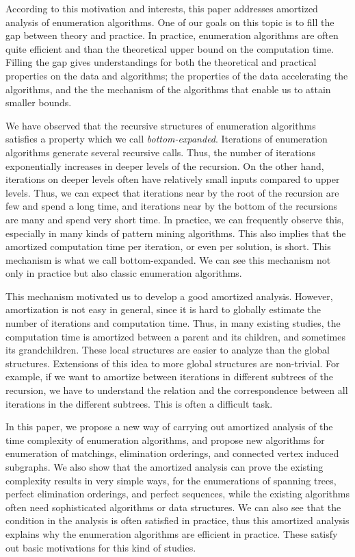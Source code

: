 \documentclass{llncs}
\begin{document}
According to this motivation and interests, this paper addresses
 amortized analysis of enumeration algorithms.
One of our goals on this topic is to fill the gap between theory and practice.
In practice, enumeration algorithms are often quite efficient and
 than the theoretical upper bound on the computation time.
Filling the gap gives understandings for both the theoretical and 
 practical properties on the data and algorithms; the properties 
 of the data accelerating the algorithms, and the the mechanism of the
 algorithms that enable us to attain smaller bounds.

We have observed that the recursive structures of enumeration algorithms
 satisfies a property which we call {\em bottom-expanded}.
Iterations of enumeration algorithms generate several recursive calls.
Thus, the number of iterations exponentially increases 
 in deeper levels of the recursion.
On the other hand, iterations on deeper levels often have relatively
 small inputs compared to upper levels.
Thus, we can expect that iterations near by the root of the recursion are
 few and spend a long time, and iterations near by the bottom of the
 recursions are many and spend very short time.
In practice, we can frequently observe this, especially in many kinds of
 pattern mining algorithms.
This also implies that the amortized computation time per
 iteration, or even per solution, is short.
This mechanism is what we call bottom-expanded.
We can see this mechanism not only in practice but also classic
 enumeration algorithms.

This mechanism motivated us to develop a good amortized analysis.
However, amortization is not easy in general, since it is hard to globally
 estimate the number of iterations and computation time.
Thus, in many existing studies, the computation time is amortized between 
 a parent and its children, and sometimes its
 grandchildren\cite{enumPEO,Ep90,Ep94,ksubtree,KpRm95,SrTmUn97}.
These local structures are easier to analyze than the global structures.
Extensions of this idea to more global structures are non-trivial.
For example, if we want to amortize between iterations in different subtrees
 of the recursion, we have to understand the relation and the correspondence
 between all iterations in the different subtrees.
This is often a difficult task.

In this paper, we propose a new way of carrying out amortized analysis of
 the time complexity of enumeration algorithms, and propose new algorithms
 for enumeration of matchings, elimination orderings, and connected 
 vertex induced subgraphs.
We also show that the amortized analysis can prove the existing complexity
 results in very simple ways, for the enumerations of spanning trees,
 perfect elimination orderings, and perfect sequences, while the existing
  algorithms often need sophisticated algorithms or data structures.
We can also see that the condition in the analysis is often satisfied
 in practice, thus this amortized analysis explains why the enumeration
 algorithms are efficient in practice.
These satisfy out basic motivations for this kind of studies.
\end{document}
